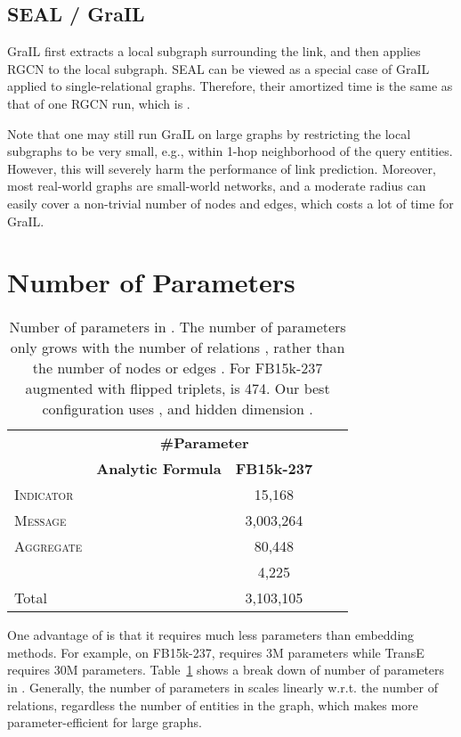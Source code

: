 \subsection{SEAL / GraIL}
GraIL first extracts a local subgraph surrounding the link, and then applies RGCN to the local subgraph. SEAL can be viewed as a special case of GraIL applied to single-relational graphs. Therefore, their amortized time is the same as that of one RGCN run, which is .

Note that one may still run GraIL on large graphs by restricting the local subgraphs to be very small, e.g., within 1-hop neighborhood of the query entities. However, this will severely harm the performance of link prediction. Moreover, most real-world graphs are small-world networks, and a moderate radius can easily cover a non-trivial number of nodes and edges, which costs a lot of time for GraIL.

\section{Number of Parameters}
\label{app:num_param}

\begin{table}[!h]
    \centering
    \caption{Number of parameters in \method. The number of parameters only grows with the number of relations , rather than the number of nodes  or edges . For FB15k-237 augmented with flipped triplets,  is 474. Our best configuration uses ,  and hidden dimension .}
    \label{tab:num_param}
    \begin{tabular}{lcccc}
        \toprule
                            & \multicolumn{2}{c}{\bf{\#Parameter}} \\
                            & \bf{Analytic Formula} & \bf{FB15k-237} \\
        \midrule
        \textsc{Indicator}  &               & 15,168        \\
        \textsc{Message}    &         & 3,003,264     \\
        \textsc{Aggregate}  &            & 80,448        \\
                  &          & 4,225         \\
        \midrule
        Total               &                       & 3,103,105     \\
        \bottomrule
    \end{tabular}
\end{table}

One advantage of \method is that it requires much less parameters than embedding methods. For example, on FB15k-237, \method requires 3M parameters while TransE requires 30M parameters. Table~\ref{tab:num_param} shows a break down of number of parameters in \method. Generally, the number of parameters in \method scales linearly w.r.t. the number of relations, regardless the number of entities in the graph, which makes \method more parameter-efficient for large graphs.

